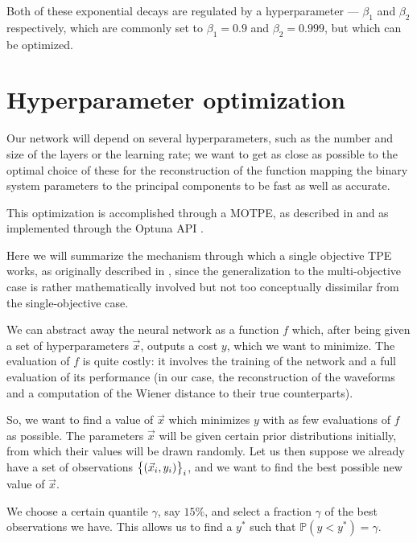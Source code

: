 \documentclass[main.tex]{subfiles}
\begin{document}
Both of these exponential decays are regulated by a hyperparameter --- \(\beta_1\) and \(\beta_2 \) respectively, which are commonly set to \(\beta_1 = 0.9\) and \(\beta_2 = 0.999\), but which can be optimized. 

\section{Hyperparameter optimization} \label{sec:optuna}

Our network will depend on several hyperparameters, such as the number and size of the layers or the learning rate; we want to get as close as possible to the optimal choice of these for the reconstruction of the function mapping the binary system parameters to the principal components to be fast as well as accurate.

This optimization is accomplished through a \ac{MOTPE}, as described in \textcite[]{ozakiMultiobjectiveTreestructuredParzen2020} and as implemented through the Optuna API \cite[]{akibaOptunaNextgenerationHyperparameter2019}.

Here we will summarize the mechanism through which a single objective \ac{TPE} works, as originally described in \textcite[section 4]{bergstraAlgorithmsHyperParameterOptimization2011}, since
the generalization to the multi-objective case \cite[]{ozakiMultiobjectiveTreestructuredParzen2020} is rather mathematically involved but not too conceptually dissimilar from the single-objective case. 

We can abstract away the neural network as a function \(f\) which, after being given a set of hyperparameters \(\vec{x}\), outputs a cost \(y\), which we want to minimize.
The evaluation of \(f\) is quite costly: it involves the training of the network and a full evaluation of its performance (in our case, the reconstruction of the waveforms and a computation of the Wiener distance to their true counterparts).  

So, we want to find a value of \(\vec{x}\) which minimizes \(y\) with as few evaluations of \(f\) as possible. 
The parameters \(\vec{x}\) will be given certain prior distributions initially, from which their values will be drawn randomly. 
Let us then suppose we already have a set of observations \(\qty{(\vec{x}_i, y_i)}_i\), and we want to find the best possible new value of \(\vec{x}\). 

We choose a certain quantile \(\gamma\), say \(15 \%\), and select a fraction \(\gamma \) of the best observations we have. This allows us to find a \(y^{*}\) such that \(\mathbb{P}(y < y^{*}) = \gamma \).  
\end{document}
